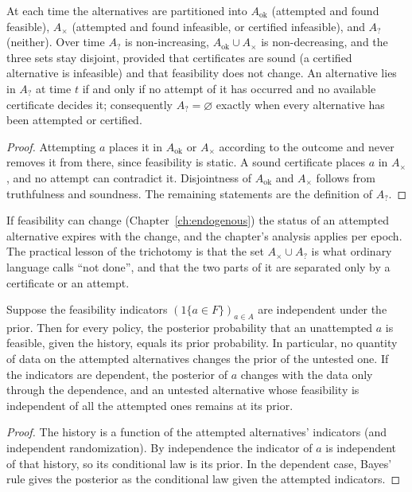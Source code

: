 \begin{newresult}[Trichotomy]\label{prop:trichotomy}
At each time the alternatives are partitioned into $A_{\mathrm{ok}}$ (attempted and found feasible), $A_{\times}$ (attempted and found infeasible, or certified infeasible), and $A_{?}$ (neither). Over time $A_{?}$ is non-increasing, $A_{\mathrm{ok}}\cup A_\times$ is non-decreasing, and the three sets stay disjoint, provided that certificates are sound (a certified alternative is infeasible) and that feasibility does not change. An alternative lies in $A_?$ at time $t$ if and only if no attempt of it has occurred and no available certificate decides it; consequently $A_?=\varnothing$ exactly when every alternative has been attempted or certified.
\end{newresult}
\begin{proof}
Attempting $a$ places it in $A_{\mathrm{ok}}$ or $A_\times$ according to the outcome and never removes it from there, since feasibility is static. A sound certificate places $a$ in $A_\times$, and no attempt can contradict it. Disjointness of $A_{\mathrm{ok}}$ and $A_\times$ follows from truthfulness and soundness. The remaining statements are the definition of $A_?$.
\end{proof}

If feasibility can change (Chapter~\ref{ch:endogenous}) the status of an attempted alternative expires with the change, and the chapter's analysis applies per epoch. The practical lesson of the trichotomy is that the set $A_{\times}\cup A_?$ is what ordinary language calls ``not done'', and that the two parts of it are separated only by a certificate or an attempt.

\begin{newresult}\label{prop:no-info}
Suppose the feasibility indicators $(1\{a\in F\})_{a\in A}$ are independent under the prior. Then for every policy, the posterior probability that an unattempted $a$ is feasible, given the history, equals its prior probability. In particular, no quantity of data on the attempted alternatives changes the prior of the untested one. If the indicators are dependent, the posterior of $a$ changes with the data only through the dependence, and an untested alternative whose feasibility is independent of all the attempted ones remains at its prior.
\end{newresult}
\begin{proof}
The history is a function of the attempted alternatives' indicators (and independent randomization). By independence the indicator of $a$ is independent of that history, so its conditional law is its prior. In the dependent case, Bayes' rule gives the posterior as the conditional law given the attempted indicators.
\end{proof}

